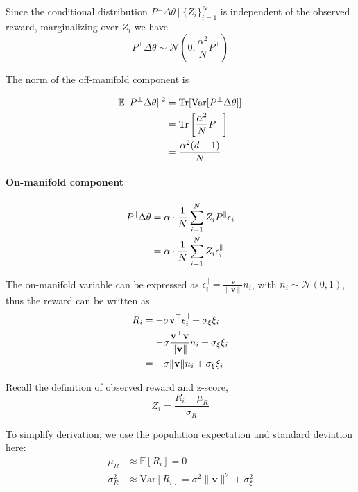     Since the conditional distribution $P^{\perp}\Delta\theta\,\big|\;\{Z_{i}\}_{i=1}^{N}$
    is independent of the observed reward, marginalizing over $Z_{i}$ we have
    \begin{equation}
    P^{\perp}\Delta\theta \sim \mathcal{N}\left(0,\frac{\alpha^{2}}{N}P^{\perp}\right)
    \end{equation}
    
    The norm of the off-manifold component is
    
    \begin{align}
    \mathbb{E}\|P^{\perp}\Delta\theta\|^{2} &=\mathrm{Tr}[\mathrm{Var}[P^{\perp}\Delta\theta]]\notag\\
    &= \mathrm{Tr}\left[\frac{\alpha^{2}}{N}P^{\perp}\right]\notag\\
    &= \frac{\alpha^{2}(d-1)}{N}
    \end{align}
    
    
    \paragraph{On-manifold component}
    
    \begin{align}
    P^{\parallel}\Delta\theta &= \alpha\cdot\frac{1}{N}\sum_{i=1}^{N}Z_{i}P^{\parallel}\epsilon_{i} \notag\\
    &= \alpha\cdot\frac{1}{N}\sum_{i=1}^{N}Z_{i}\epsilon_{i}^{\parallel}
    \end{align}
    
    The on-manifold variable can be expressed as $\epsilon_{i}^{\parallel} = \frac{\mathbf{v}}{\|\mathbf{v}\|} n_{i}$,
    with $n_{i} \sim \mathcal{N}(0,1)$, thus the reward can be written as 
    \begin{align}
    R_{i} &= -\sigma\mathbf{v}^{\top} \epsilon_{i}^{\parallel} + \sigma_{\xi}\xi_{i} \notag\\
    &= -\sigma \frac{\mathbf{v}^{\top}\mathbf{v}}{\|\mathbf{v}\|} n_{i} + \sigma_{\xi}\xi_{i} \notag\\
    &= -\sigma\|\mathbf{v}\| n_{i} + \sigma_{\xi}\xi_{i}
    \end{align}
    
    Recall the definition of observed reward and z-score, 
    \begin{equation}
    Z_{i} = \frac{R_{i} - \mu_{R}}{\sigma_{R}}
    \end{equation}
    
    To simplify derivation, we use the population expectation and standard
    deviation here: 
    \begin{align}
    \mu_{R} &\approx \mathbb{E}[R_{i}] = 0\\
    \sigma_{R}^{2} &\approx \mathrm{Var}[R_{i}] = \sigma^{2}\|\mathbf{v}\|^{2} + \sigma_{\xi}^{2}
    \end{align}
    
